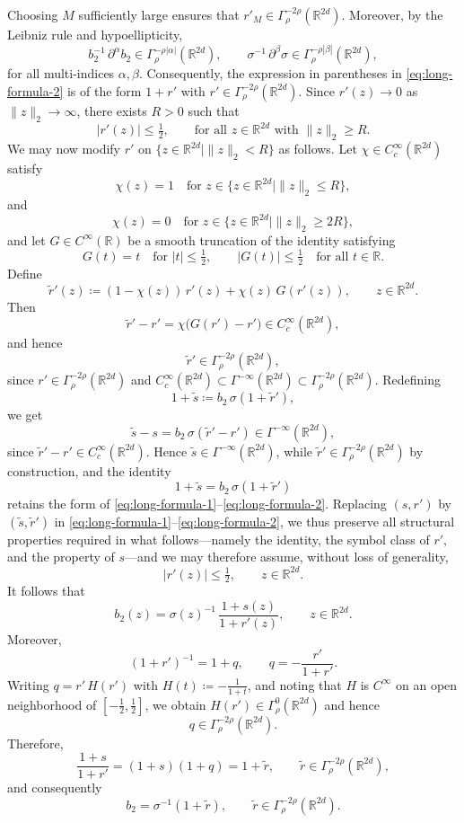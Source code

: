 \documentclass[a4paper,12pt]{article}
\newcommand{\R}{\mathbb{R}}
\begin{document}
Choosing $M$ sufficiently large ensures that $r'_M\in\Gamma^{-2\rho}_{\rho}(\R^{2d})$.
Moreover, by the Leibniz rule and hypoellipticity,
\[
b_2^{-1}\,\partial^\alpha b_2 \in \Gamma^{-\rho|\alpha|}_{\rho}(\R^{2d}),
\qquad
\sigma^{-1}\,\partial^\beta \sigma \in \Gamma^{-\rho|\beta|}_{\rho}(\R^{2d}),
\]
for all multi-indices $\alpha,\beta$.
Consequently, the expression in parentheses in \eqref{eq:long-formula-2}
is of the form $1+r'$ with $r'\in\Gamma^{-2\rho}_{\rho}(\R^{2d})$.
Since $r'(z)\to 0$ as $\|z\|_2\to\infty$, there exists $R>0$ such that
\[
|r'(z)|\le \tfrac12,
\qquad \text{for all } z\in\R^{2d} \text{ with } \|z\|_2 \ge R.
\]
We may now modify $r'$ on $\{z\in\R^{2d} \mid \|z\|_2<R \}$ as follows.
Let $\chi\in C_c^\infty(\R^{2d})$ satisfy
\[
\chi(z)=1 \quad \text{for } z\in\{z\in\R^{2d} \mid \|z\|_2\le R \},
\]
and
\[
\chi(z)=0 \quad \text{for } z\in\{z\in\R^{2d} \mid \|z\|_2\ge 2R \},
\]
and let $G\in C^\infty(\R)$ be a smooth truncation of the identity satisfying
\[
G(t)=t \quad \text{for } |t|\le \tfrac12,
\qquad
|G(t)|\le \tfrac12 \quad \text{for all } t\in\R.
\]
Define
\[
\widetilde r'(z)\coloneqq (1-\chi(z))\,r'(z)+\chi(z)\,G(r'(z)),
\qquad z\in\R^{2d}.
\]
Then
\[
\widetilde r' - r'
=
\chi\bigl(G(r')-r'\bigr)
\in C_c^\infty(\R^{2d}),
\]
and hence
\[
\widetilde r' \in \Gamma^{-2\rho}_{\rho}(\R^{2d}),
\]
since $r'\in \Gamma^{-2\rho}_{\rho}(\R^{2d})$ and
$C_c^\infty(\R^{2d})\subset \Gamma^{-\infty}(\R^{2d})
\subset \Gamma^{-2\rho}_{\rho}(\R^{2d})$.
Redefining
\[
1+\widetilde s \coloneqq b_2\,\sigma(1+\widetilde r'),
\]
we get 
\[
\widetilde s - s = b_2 \, \sigma(\widetilde r' - r')\in \Gamma^{-\infty}(\R^{2d}),
\]
since $\widetilde r'-r'\in C_c^\infty(\R^{2d})$.
Hence $\widetilde s\in\Gamma^{-\infty}(\R^{2d})$, while
$\widetilde r'\in\Gamma^{-2\rho}_{\rho}(\R^{2d})$ by construction, and the identity
\[
1+\widetilde s = b_2\,\sigma(1+\widetilde r')
\]
retains the form of \eqref{eq:long-formula-1}--\eqref{eq:long-formula-2}.
Replacing $(s,r')$ by $(\widetilde s,\widetilde r')$ in \eqref{eq:long-formula-1}--\eqref{eq:long-formula-2}, we thus preserve all structural
properties required in what follows—namely the identity, the symbol class of $r'$, and
the property of $s$—and we may therefore assume, without loss of generality, 
\[
|r'(z)|\le \tfrac12,
\qquad z\in\R^{2d}.
\]
It follows that
\[
b_2(z)=\sigma(z)^{-1}\,\frac{1+s(z)}{1+r'(z)},
\qquad z\in\R^{2d}.
\]
Moreover,
\[
(1+r')^{-1}=1+q,
\qquad
q=-\frac{r'}{1+r'}.
\]
Writing $q=r'\,H(r')$ with $H(t)\coloneqq -\frac{1}{1+t}$, and noting that $H$ is $C^\infty$ on an open neighborhood of
$[-\tfrac12,\tfrac12]$, we obtain $H(r')\in\Gamma^0_{\rho}(\R^{2d})$ and hence
\[
q\in\Gamma^{-2\rho}_{\rho}(\R^{2d}).
\]
Therefore,
\[
\frac{1+s}{1+r'} = (1+s)(1+q) = 1+\tilde r,
\qquad
\tilde r \in \Gamma^{-2\rho}_{\rho}(\R^{2d}),
\]
and consequently
\begin{equation}\label{eq:b2-symbol}
b_2=\sigma^{-1}(1+\tilde r),
\qquad \tilde r\in\Gamma^{-2\rho}_{\rho}(\R^{2d}).
\end{equation}
\end{document}
